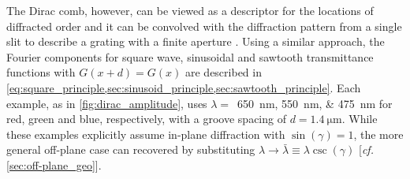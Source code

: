 The Dirac comb, however, can be viewed as a descriptor for the locations of diffracted order and it can be convolved with the diffraction pattern from a single slit to describe a grating with a finite aperture \cite{Loewen97,DeRoo16thesis}. 
Using a similar approach, the Fourier components for square wave, sinusoidal and sawtooth transmittance functions with $G (x+d) = G (x)$ are described in \cref{eq:square_principle,sec:sinusoid_principle,sec:sawtooth_principle}. 
Each example, as in \cref{fig:dirac_amplitude}, uses $\lambda =$~\SIlist{650;550;475}{\nm} for red, green and blue, respectively, with a groove spacing of $d = \SI{1.4}{\micro\metre}$. 
While these examples explicitly assume in-plane diffraction with $\sin \left( \gamma \right) = 1$, the more general off-plane case can recovered by substituting $\lambda \to \bar{\lambda} \equiv \lambda \csc \left( \gamma \right)$ [\emph{cf.\@} \cref{sec:off-plane_geo}]. 

